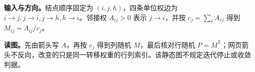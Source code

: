 \documentclass[UTF8,a4paper,11pt,openany]{ctexbook}
\begin{document}
\setcounter{page}{743}
\setcounter{chapter}{36}
\setcounter{section}{1}
\setcounter{figure}{1}
\pagestyle{headings}
\textbf{输入与方向。}结点顺序固定为 $(i,j,h)$，四条单位权边为 $i\to j,j\to i,j\to h,h\to i$。邻接权 $A_{ij}>0$ 表示 $j\to i$，并按 $c_j=\sum_rA_{rj}$ 得到 $M_{ij}=A_{ij}/c_j$。

\FloatBarrier
\textbf{读图。}先由箭头写 $A$，再按 $c_j$ 得到列随机 $M$，最后核对行随机 $P=M^{\mathsf T}$；网页箭头不反向，改变的只是同一转移权重的行列索引。该静态图不规定迭代停止或收敛判据。
\end{document}
